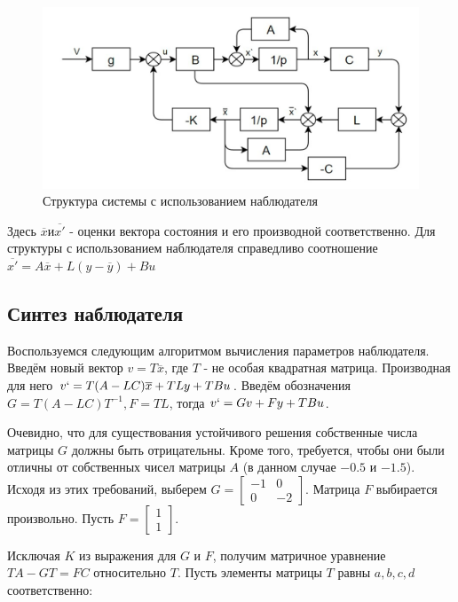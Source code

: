 \begin{figure}[h!]
	\centering
	\includegraphics[scale = 0.37]{images/2.png}
	\caption{Структура системы с использованием наблюдателя}
	\label{image:3}
\end{figure}
\FloatBarrier
Здесь $\overline{x} и \overline{x'}$ - оценки вектора состояния и его производной соответственно. Для структуры с использованием наблюдателя справедливо соотношение $\overline{x'}=A\overline{x}+L(y-\overline{y})+Bu$

\subsection{Синтез наблюдателя}

Воспользуемся следующим алгоритмом вычисления параметров наблюдателя. Введём новый вектор $v=T\overline{x}$, где $T$ - не особая квадратная матрица. Производная для него $v`=T(A-LC)\overline{x}+TLy+TBu$. Введём обозначения $G=T(A-LC)T^{-1}, F=TL$, тогда $v`=Gv+Fy+TBu$.

Очевидно, что для существования устойчивого решения собственные числа матрицы $G$ должны быть отрицательны. Кроме того, требуется, чтобы они были отличны от собственных чисел матрицы $A$ (в данном случае $-0.5$ и $-1.5$). Исходя из этих требований, выберем $G=\begin{bmatrix} -1 & 0 \\ 0 & -2 \end{bmatrix}$. Матрица $F$ выбирается произвольно. Пусть $F=\begin{bmatrix} 1 \\ 1 \end{bmatrix}$.


Исключая $K$ из выражения для $G$ и $F$, получим матричное уравнение $TA-GT=FC$ относительно $T$. Пусть элементы матрицы $T$ равны $a,b,c,d$ соответственно:



